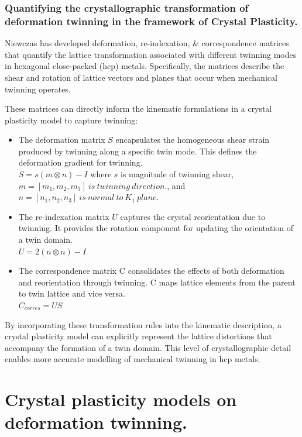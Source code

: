 \subsubsection{Quantifying the crystallographic transformation of deformation twinning in the framework of Crystal Plasticity.}

Niewczas\cite{Niewczas121} has developed deformation, re-indexation, \& correspondence matrices that quantify the lattice transformation associated with different twinning modes in hexagonal close-packed (hcp) metals. Specifically, the matrices describe the shear and rotation of lattice vectors and planes that occur when mechanical twinning operates.

These matrices can directly inform the kinematic formulations in a crystal plasticity model to capture twinning:
\begin{itemize}
\item The deformation matrix $S$ encapsulates the homogeneous shear strain produced by twinning along a specific twin mode. This defines the deformation gradient for twinning. \\ $S = s(m\otimes n)-I$ where $s$ is magnitude of twinning shear, \\ $m = [m_1,m_2,m_3] \ is \ twinning\ direction.$, and \\ $n = [n_1,n_2,n_3] \ is \ normal\ to\ K_1\ plane.$
\item The re-indexation matrix $U$ captures the crystal reorientation due to twinning. It provides the rotation component for updating the orientation of a twin domain. \\ $U = 2(n\otimes n)-I$
\item The correspondence matrix C consolidates the effects of both deformation and reorientation through twinning. C maps lattice elements from the parent to twin lattice and vice versa. \\ $C_{corres} = US$
\end{itemize}

By incorporating these transformation rules into the kinematic description, a crystal plasticity model can explicitly represent the lattice distortions that accompany the formation of a twin domain. This level of crystallographic detail enables more accurate modelling of mechanical twinning in hcp metals.

\section{Crystal plasticity models on deformation twinning.}

